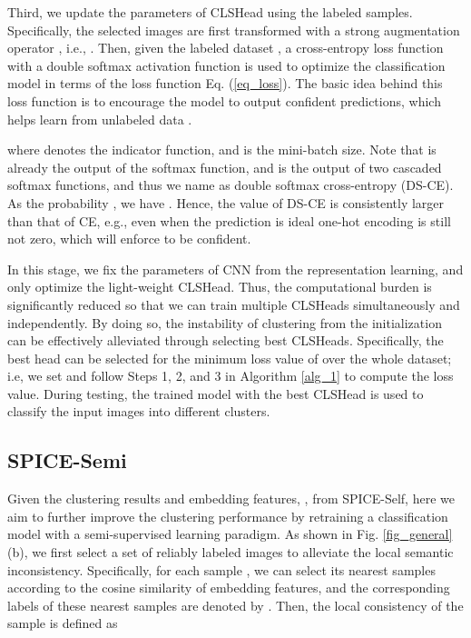 \documentclass[10pt,twocolumn,letterpaper]{article}
\begin{document}
Third, we update the parameters of CLSHead using the labeled samples.
Specifically, the selected images  are first transformed with a strong augmentation operator , i.e., . Then, given the labeled dataset , a cross-entropy loss function with a double softmax activation function is used to optimize the classification model in terms of the loss function Eq. (\ref{eq_loss}). The basic idea behind this loss function is to encourage the model to output confident predictions, which helps learn from unlabeled data \cite{NIPS2004_96f2b50b}.

where  denotes the indicator function, and  is the mini-batch size. Note that  is already the output of the softmax function, and  is the output of two cascaded softmax functions, and thus we name  as double softmax cross-entropy (DS-CE).
As the probability , we have . Hence, the value of DS-CE is consistently larger than that of CE, e.g., even when the prediction  is ideal one-hot encoding  is still not zero, which will enforce  to be confident.

In this stage, we fix the parameters of CNN from the representation learning, and only optimize the light-weight CLSHead. Thus, the computational burden is significantly reduced so that we can train multiple CLSHeads simultaneously and independently. By doing so, the instability of clustering from the initialization can be effectively alleviated through selecting best CLSHeads. Specifically, the best head can be selected for the minimum loss value of  over the whole dataset; i.e, we set  and follow Steps 1, 2, and 3 in Algorithm \ref{alg_1} to compute the loss value.
During testing, the trained model with the best CLSHead is used to classify the input images into different clusters.

\subsection{SPICE-Semi}
\label{sec_semi}
Given the clustering results and embedding features, , from SPICE-Self, here we aim to further improve the clustering performance by retraining a classification model with a semi-supervised learning paradigm. As shown in Fig. \ref{fig_general}(b), we first select a set of reliably labeled images to alleviate the local semantic inconsistency. Specifically, for each sample , we can select its  nearest samples according to the cosine similarity of embedding features, and the corresponding labels of these nearest samples are denoted by . Then, the local consistency  of the sample  is defined as
\end{document}
